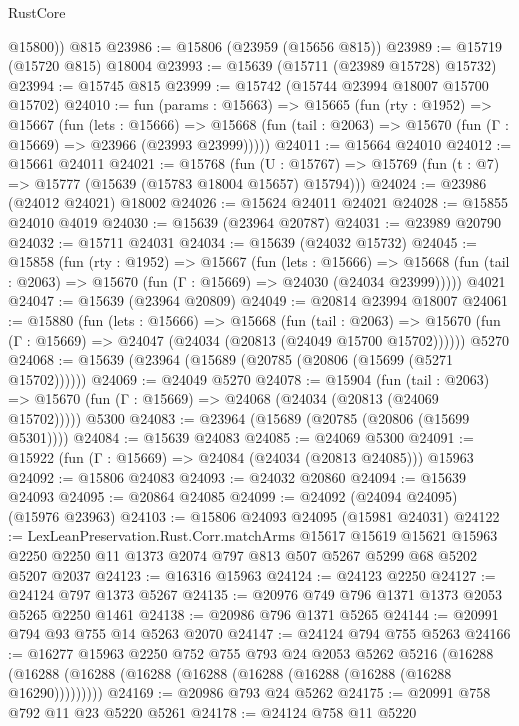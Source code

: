 \begin{lexlean}{RustCore}
\begin{coremodule}
        @15800))
    @815
@23986 := @15806 (@23959 (@15656 @815))
@23989 := @15719 (@15720 @815) @18004
@23993 := @15639 (@15711 (@23989 @15728) @15732)
@23994 := @15745 @815
@23999 := @15742 (@15744 @23994 @18007 @15700 @15702)
@24010 := fun (params : @15663) =>
  @15665
    (fun (rty : @1952) =>
    @15667
      (fun (lets : @15666) =>
      @15668 (fun (tail : @2063) => @15670 (fun (Γ : @15669) => @23966 (@23993 @23999)))))
@24011 := @15664 @24010
@24012 := @15661 @24011
@24021 := @15768
    (fun (U : @15767) => @15769 (fun (t : @7) => @15777 (@15639 (@15783 @18004 @15657) @15794)))
@24024 := @23986 (@24012 @24021) @18002
@24026 := @15624 @24011 @24021
@24028 := @15855 @24010 @4019
@24030 := @15639 (@23964 @20787)
@24031 := @23989 @20790
@24032 := @15711 @24031
@24034 := @15639 (@24032 @15732)
@24045 := @15858
    (fun (rty : @1952) =>
    @15667
      (fun (lets : @15666) =>
      @15668 (fun (tail : @2063) => @15670 (fun (Γ : @15669) => @24030 (@24034 @23999)))))
    @4021
@24047 := @15639 (@23964 @20809)
@24049 := @20814 @23994 @18007
@24061 := @15880
    (fun (lets : @15666) =>
    @15668
      (fun (tail : @2063) =>
      @15670 (fun (Γ : @15669) => @24047 (@24034 (@20813 (@24049 @15700 @15702))))))
    @5270
@24068 := @15639 (@23964 (@15689 (@20785 (@20806 (@15699 (@5271 @15702))))))
@24069 := @24049 @5270
@24078 := @15904
    (fun (tail : @2063) => @15670 (fun (Γ : @15669) => @24068 (@24034 (@20813 (@24069 @15702)))))
    @5300
@24083 := @23964 (@15689 (@20785 (@20806 (@15699 @5301))))
@24084 := @15639 @24083
@24085 := @24069 @5300
@24091 := @15922 (fun (Γ : @15669) => @24084 (@24034 (@20813 @24085))) @15963
@24092 := @15806 @24083
@24093 := @24032 @20860
@24094 := @15639 @24093
@24095 := @20864 @24085
@24099 := @24092 (@24094 @24095) (@15976 @23963)
@24103 := @15806 @24093 @24095 (@15981 @24031)
@24122 := LexLeanPreservation.Rust.Corr.matchArms
    @15617
    @15619
    @15621
    @15963
    @2250
    @2250
    @11
    @1373
    @2074
    @797
    @813
    @507
    @5267
    @5299
    @68
    @5202
    @5207
    @2037
@24123 := @16316 @15963
@24124 := @24123 @2250
@24127 := @24124 @797 @1373 @5267
@24135 := @20976 @749 @796 @1371 @1373 @2053 @5265 @2250 @1461
@24138 := @20986 @796 @1371 @5265
@24144 := @20991 @794 @93 @755 @14 @5263 @2070
@24147 := @24124 @794 @755 @5263
@24166 := @16277
    @15963
    @2250
    @752
    @755
    @793
    @24
    @2053
    @5262
    @5216
    (@16288 (@16288 (@16288 (@16288 (@16288 (@16288 (@16288 (@16288 (@16288 @16290)))))))))
@24169 := @20986 @793 @24 @5262
@24175 := @20991 @758 @792 @11 @23 @5220 @5261
@24178 := @24124 @758 @11 @5220

\end{coremodule}
\end{lexlean}
